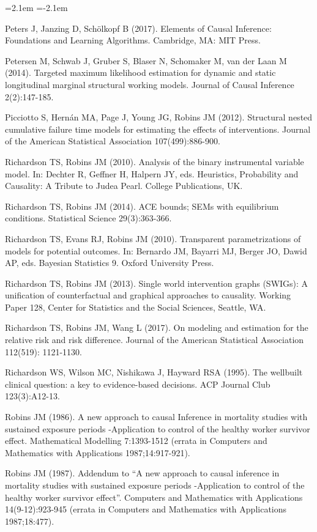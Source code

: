 \begin{list}{}{\leftmargin=2.1em   \itemindent=-2.1em \parsep=0pt \itemsep=1.6pt \topsep=4pt \rightmargin=0pt}
\item Peters J, Janzing D, Schölkopf B (2017). Elements of Causal Inference: Foundations and Learning Algorithms. Cambridge, MA: MIT Press.
\item Petersen M, Schwab J, Gruber S, Blaser N, Schomaker M, van der Laan M (2014). Targeted maximum likelihood estimation for dynamic and static longitudinal marginal structural working models. Journal of Causal Inference 2(2):147-185.
\item Picciotto S, Hernán MA, Page J, Young JG, Robins JM (2012). Structural nested cumulative failure time models for estimating the effects of interventions. Journal of the American Statistical Association 107(499):886-900.
\item Richardson TS, Robins JM (2010). Analysis of the binary instrumental variable model. In: Dechter R, Geffner H, Halpern JY, eds. Heuristics, Probability and Causality: A Tribute to Judea Pearl. College Publications, UK.
\item Richardson TS, Robins JM (2014). ACE bounds; SEMs with equilibrium conditions. Statistical Science 29(3):363-366.
\item Richardson TS, Evans RJ, Robins JM (2010). Transparent parametrizations of models for potential outcomes. In: Bernardo JM, Bayarri MJ, Berger JO, Dawid AP, eds. Bayesian Statistics 9. Oxford University Press.
\item Richardson TS, Robins JM (2013). Single world intervention graphs (SWIGs): A unification of counterfactual and graphical approaches to causality. Working Paper 128, Center for Statistics and the Social Sciences, Seattle, WA.
\item Richardson TS, Robins JM, Wang L (2017). On modeling and estimation for the relative risk and risk difference. Journal of the American Statistical Association 112(519): 1121-1130.
\item Richardson WS, Wilson MC, Nishikawa J, Hayward RSA (1995). The wellbuilt clinical question: a key to evidence-based decisions. ACP Journal Club 123(3):A12-13.
\item Robins JM (1986). A new approach to causal Inference in mortality studies with sustained exposure periods -Application to control of the healthy worker survivor effect. Mathematical Modelling 7:1393-1512 (errata in Computers and Mathematics with Applications 1987;14:917-921).
\item Robins JM (1987). Addendum to ``A new approach to causal inference in mortality studies with sustained exposure periods -Application to control of the healthy worker survivor effect''. Computers and Mathematics with Applications 14(9-12):923-945 (errata in Computers and Mathematics with Applications 1987;18:477).

\end{list}
